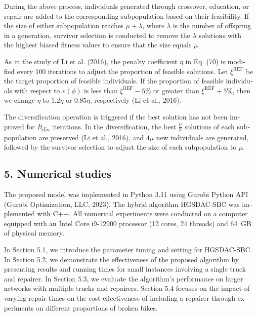 \documentclass[
  english,
]{article}
\begin{document}
\begin{otherlanguage}{english}
\protect{}\label{p0590}
During the above process, individuals generated through crossover, education, or repair are added to
the corresponding subpopulation based on their feasibility. If the size of either subpopulation
reaches \(\mu + \lambda\), where \(\lambda\) is the number of offspring in a generation, survivor
selection is conducted to remove the \(\lambda\) solutions with the highest biased fitness values to
ensure that the size equals \(\mu\).

\protect{}\label{p0595}
As in the study of Li et al. (2016), the penalty coefficient \(\eta\) in Eq. (70) is modified every
100 iterations to adjust the proportion of feasible solutions. Let \(\xi^{\text{REF}}\) be the
target proportion of feasible individuals. If the proportion of feasible individuals with respect to
\(\varepsilon(\phi)\) is less than \(\xi^{\text{REF}} - 5\%\) or greater than
\(\xi^{\text{REF}} + 5\%\), then we change \(\eta\) to \(1.2\eta\) or \(0.85\eta\), respectively (Li
et al., 2016).

\protect{}\label{p0600}
The diversification operation is triggered if the best solution has not been improved for
\emph{It}\textsubscript{div} iterations. In the diversification, the best \(\frac{\mu}{3}\)
solutions of each subpopulation are preserved (Li et al., 2016), and \(4\mu\) new individuals are
generated, followed by the survivor selection to adjust the size of each subpopulation to \(\mu\).

\protect{}\label{s0105}
\subsection{5. Numerical studies}\label{st125}

\protect{}\label{p0605}
The proposed model was implemented in Python 3.11 using Gurobi Python API (Gurobi Optimization, LLC,
2023). The hybrid algorithm HGSDAC-SBC was implemented with C++. All numerical experiments were
conducted on a computer equipped with an Intel Core i9-12900 processor (12 cores, 24 threads) and
64~GB of physical memory.

\protect{}\label{p0610}
In Section 5.1, we introduce the parameter tuning and setting for HGSDAC-SBC. In Section 5.2, we
demonstrate the effectiveness of the proposed algorithm by presenting results and running times for
small instances involving a single truck and repairer. In Section 5.3, we evaluate the algorithm's
performance on larger networks with multiple trucks and repairers. Section 5.4 focuses on the impact
of varying repair times on the cost-effectiveness of including a repairer through experiments on
different proportions of broken bikes.


\end{otherlanguage}
\end{document}
